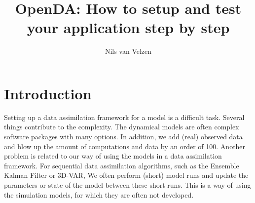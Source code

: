 \documentclass[a4paper,10pt]{article}
\title{OpenDA: How to setup and test your application step by step}
\author{Nils van Velzen}
\begin{document}

\maketitle
\section{Introduction}
Setting up a data assimilation framework for a model is a difficult task. Several things contribute to the complexity. The dynamical models are often complex software packages with many options. In addition, we add (real) observed data and blow up the amount of computations and data by an order of 100. 
Another problem is related to our way of using the models in a data assimilation framework. For sequential data assimilation algorithms, such as the Ensemble Kalman Filter or 3D-VAR, We often perform (short) model runs and update the parameters or state of the model between these short runs. This is a way of using the simulation models, for which they are often not developed.
\end{document}
